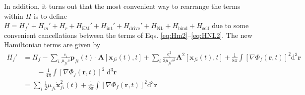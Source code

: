 \documentclass{article}
\begin{document}
In addition, it turns out that the most convenient way to rearrange the terms within $H$ is to define $H = H_f' + H_m' + H_r + H_\mathrm{EM}' + H_\mathrm{int}' + H_\mathrm{drive}' + H_\mathrm{NL} + H_\mathrm{bind} + H_\mathrm{self}$ due to some convenient cancellations between the terms of Eqs. \eqref{eq:Hm2}--\eqref{eq:HNL2}. The new Hamiltonian terms are given by
\begin{equation}
\begin{split}
H_f' &= H_f - \sum_i\frac{e_i}{\mu_{fi}c}\mathbf{p}_{fi}(t)\cdot\mathbf{A}[\mathbf{x}_{fi}(t),t] + \sum_i\frac{e_i^2}{2\mu_{fi}c^2}\mathbf{A}^2[\mathbf{x}_{fi}(t),t] + \frac{1}{8\pi}\int\left[\nabla\Phi_f(\mathbf{r},t)\right]^2\mathrm{d}^3\mathbf{r}\\
&\qquad - \frac{1}{4\pi}\int\left[\nabla\Phi_f(\mathbf{r},t)\right]^2\;\mathrm{d}^3\mathbf{r}\\
&= \sum_i\frac{1}{2}\mu_{fi}\dot{\mathbf{x}}^2_{fi}(t) + \frac{1}{8\pi}\int\left[\nabla\Phi_f(\mathbf{r},t)\right]^2\mathrm{d}^3\mathbf{r}
\end{split}
\end{equation}
\end{document}
